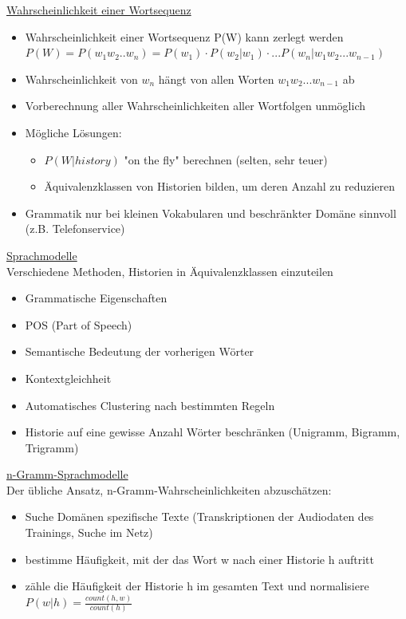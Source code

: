 \documentclass[a4paper,10pt,oneside]{article}
\begin{document}
\underline{Wahrscheinlichkeit einer Wortsequenz} \\
	\begin{itemize}
		\item Wahrscheinlichkeit einer Wortsequenz P(W) kann zerlegt werden $P(W) = P(w_1 w_2 .. w_n) = P(w_1) \cdot P(w_2 | w_1) \cdot ... P(w_n | w_1 w_2 ... w_{n-1})$
		\item Wahrscheinlichkeit von $w_n$ hängt von allen Worten $w_1 w_2 ... w_{n-1}$ ab
		\item Vorberechnung aller Wahrscheinlichkeiten aller Wortfolgen unmöglich
		\item Mögliche Lösungen:
			\begin{itemize}
				\item $P(W|history)$ "on the fly" berechnen (selten, sehr teuer)
				\item Äquivalenzklassen von Historien bilden, um deren Anzahl zu reduzieren
			\end{itemize}
		\item Grammatik nur bei kleinen Vokabularen und beschränkter Domäne sinnvoll (z.B. Telefonservice)
	\end{itemize}

\underline{Sprachmodelle} \\
Verschiedene Methoden, Historien in Äquivalenzklassen einzuteilen
	\begin{itemize}
		\item Grammatische Eigenschaften
		\item POS (Part of Speech)
		\item Semantische Bedeutung der vorherigen Wörter
		\item Kontextgleichheit 
		\item Automatisches Clustering nach bestimmten Regeln
		\item Historie auf eine gewisse Anzahl Wörter beschränken (Unigramm, Bigramm, Trigramm)
	\end{itemize}

\underline{n-Gramm-Sprachmodelle} \\
Der übliche Ansatz, n-Gramm-Wahrscheinlichkeiten abzuschätzen:
	\begin{itemize}
		\item Suche Domänen spezifische Texte (Transkriptionen der Audiodaten des Trainings, Suche im Netz)
		\item bestimme Häufigkeit, mit der das Wort w nach einer Historie h auftritt
		\item zähle die Häufigkeit der Historie h im gesamten Text und normalisiere $P(w|h) = \frac{count(h,w)}{count(h)}$
	\end{itemize}
	
\end{document}
